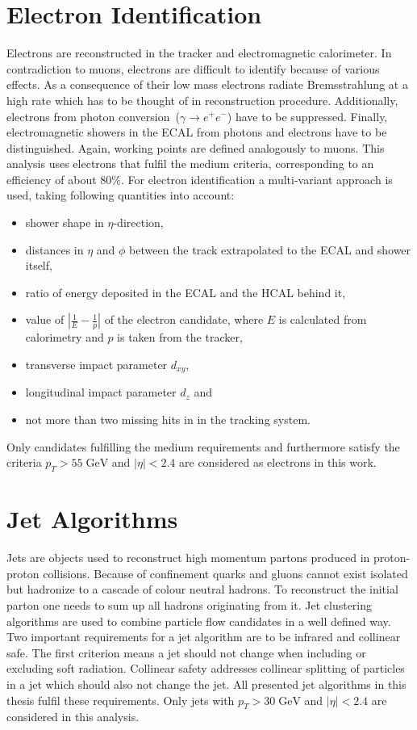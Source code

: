 \section{Electron Identification}
	Electrons are reconstructed in the tracker and electromagnetic calorimeter. In contradiction to muons, electrons are difficult to identify because of various effects. As a consequence of their low mass electrons radiate Bremsstrahlung at a high rate which has to be thought of in reconstruction procedure. Additionally, electrons from photon conversion~($\gamma \rightarrow e^+ e^-$) have to be suppressed. Finally, electromagnetic showers in the ECAL from photons and electrons have to be distinguished. Again, working points \cite{ElecID} are defined analogously to muons. This analysis uses electrons that fulfil the medium criteria, corresponding to an efficiency of about $80\%$. For electron identification a multi-variant approach is used, taking following quantities into account:
	\begin{itemize}
	\item shower shape in $\eta$-direction,
	\item distances in $\eta$ and $\phi$ between the track extrapolated to the ECAL and shower itself,
	\item ratio of energy deposited in the ECAL and the HCAL behind it,
	\item value of $|\frac{1}{E} - \frac{1}{p}|$ of the electron candidate, where $E$ is calculated from calorimetry and $p$ is taken from the tracker,
	\item transverse impact parameter $d_{xy}$,
	\item longitudinal impact parameter $d_{z}$ and
	\item not more than two missing hits in in the tracking system.
	\end{itemize}
	Only candidates fulfilling the medium requirements and furthermore satisfy the criteria $p_T > 55\;\text{GeV}$ and $|\eta| < 2.4$ are considered as electrons in this work.
\section{Jet Algorithms}
	Jets are objects used to reconstruct high momentum partons produced in proton-proton collisions. Because of confinement quarks and gluons cannot exist isolated but hadronize to a cascade of colour neutral hadrons. To reconstruct the initial parton one needs to sum up all hadrons originating from it. Jet clustering algorithms are used to combine particle flow candidates in a well defined way. Two important requirements for a jet algorithm are to be infrared and collinear safe. The first criterion means a jet should not change when including or excluding soft radiation. Collinear safety addresses collinear splitting of particles in a jet which should also not change the jet. All presented jet algorithms in this thesis fulfil these requirements. Only jets with $p_T > 30\;\text{GeV}$ and $|\eta| < 2.4$ are considered in this analysis.
	
